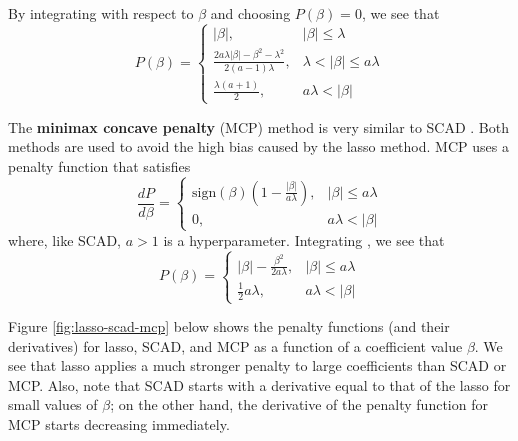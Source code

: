 \documentclass{article}
\newcommand{\sign}{\text{sign}}
\begin{document}
By integrating with respect to $\beta$ \cite{breheny2016lasso} and choosing $P(\beta) = 0$, we see that
\begin{equation}
	P(\beta) = \left\{\begin{array}{ll}
		\vert \beta \vert,&\vert \beta \vert \leq \lambda\\
		\frac{2a\lambda\vert\beta\vert - \beta^2-\lambda^2}{2(a - 1)\lambda},&\lambda < \vert \beta \vert \leq a\lambda\\
		\frac{\lambda(a + 1)}{2},&a\lambda < \vert \beta \vert
	\end{array}\right.
\end{equation}

The \textbf{minimax concave penalty} (MCP) method is very similar to SCAD \cite{zhang2010nearly, breheny2016lasso}. Both methods are used to avoid the high bias caused by the lasso method. MCP uses a penalty function that satisfies
\begin{equation}
	\frac{dP}{d\beta} = \left\{\begin{array}{ll}
		\sign(\beta)\left(1 - \frac{\vert \beta \vert}{a\lambda}\right),& \vert \beta \vert \leq a\lambda\\
		0,&a\lambda < \vert \beta \vert
	\end{array}\right.
\end{equation}
where, like SCAD, $a>1$ is a hyperparameter. Integrating \cite{breheny2016lasso}, we see that
\begin{equation}
	P(\beta) = \left\{\begin{array}{ll}
		\vert \beta \vert - \frac{\beta^2}{2a\lambda},&\vert \beta \vert \leq a\lambda\\
		\frac{1}{2}a\lambda,&a\lambda < \vert \beta \vert
	\end{array}\right.
\end{equation}

Figure \ref{fig:lasso-scad-mcp} below shows the penalty functions (and their derivatives) for lasso, SCAD, and MCP as a function of a coefficient value $\beta$. We see that lasso applies a much stronger penalty to large coefficients than SCAD or MCP. Also, note that SCAD starts with a derivative equal to that of the lasso for small values of $\beta$; on the other hand, the derivative of the penalty function for MCP starts decreasing immediately.
\end{document}

